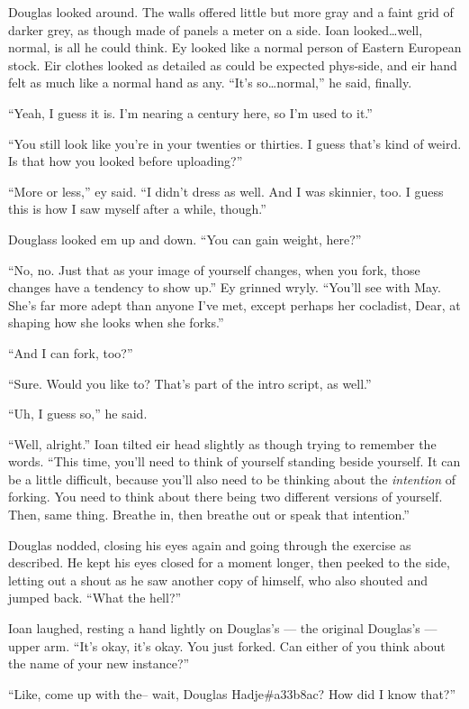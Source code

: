 Douglas looked around. The walls offered little but more gray and a faint grid of darker grey, as though made of panels a meter on a side. Ioan looked\ldots well, normal, is all he could think. Ey looked like a normal person of Eastern European stock. Eir clothes looked as detailed as could be expected phys-side, and eir hand felt as much like a normal hand as any. ``It's so\ldots normal,'' he said, finally.

``Yeah, I guess it is. I'm nearing a century here, so I'm used to it.''

``You still look like you're in your twenties or thirties. I guess that's kind of weird. Is that how you looked before uploading?''

``More or less,'' ey said. ``I didn't dress as well. And I was skinnier, too. I guess this is how I saw myself after a while, though.''

Douglass looked em up and down. ``You can gain weight, here?''

``No, no. Just that as your image of yourself changes, when you fork, those changes have a tendency to show up.'' Ey grinned wryly. ``You'll see with May. She's far more adept than anyone I've met, except perhaps her cocladist, Dear, at shaping how she looks when she forks.''

``And I can fork, too?''

``Sure. Would you like to? That's part of the intro script, as well.''

``Uh, I guess so,'' he said.

``Well, alright.'' Ioan tilted eir head slightly as though trying to remember the words. ``This time, you'll need to think of yourself standing beside yourself. It can be a little difficult, because you'll also need to be thinking about the \emph{intention} of forking. You need to think about there being two different versions of yourself. Then, same thing. Breathe in, then breathe out or speak that intention.''

Douglas nodded, closing his eyes again and going through the exercise as described. He kept his eyes closed for a moment longer, then peeked to the side, letting out a shout as he saw another copy of himself, who also shouted and jumped back. ``What the hell?''

Ioan laughed, resting a hand lightly on Douglas's — the original Douglas's — upper arm. ``It's okay, it's okay. You just forked. Can either of you think about the name of your new instance?''

``Like, come up with the-- wait, Douglas Hadje\#a33b8ac? How did I know that?''

